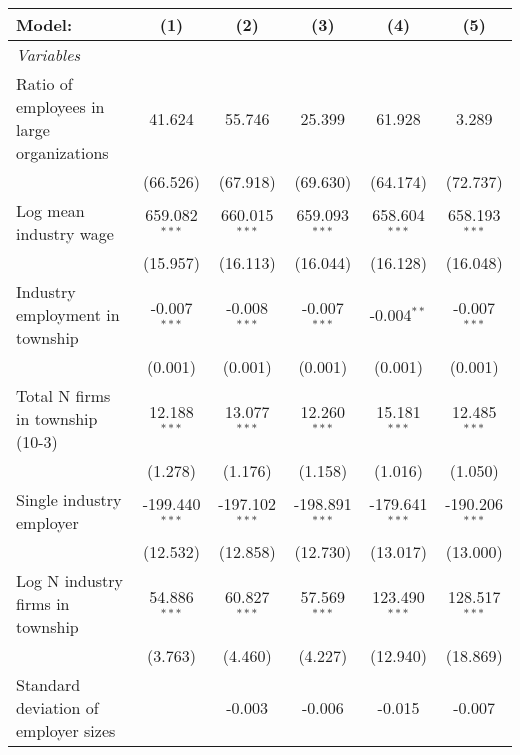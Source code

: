 \begingroup
\centering
\begin{tabular}{lccccc}
   \tabularnewline \midrule \midrule
   Model:                                    & (1)              & (2)              & (3)              & (4)              & (5)\\  
   \midrule
   \emph{Variables}\\
   Ratio of employees in large organizations & 41.624           & 55.746           & 25.399           & 61.928           & 3.289\\   
                                             & (66.526)         & (67.918)         & (69.630)         & (64.174)         & (72.737)\\   
   Log mean industry wage                    & 659.082$^{***}$  & 660.015$^{***}$  & 659.093$^{***}$  & 658.604$^{***}$  & 658.193$^{***}$\\   
                                             & (15.957)         & (16.113)         & (16.044)         & (16.128)         & (16.048)\\   
   Industry employment in township           & -0.007$^{***}$   & -0.008$^{***}$   & -0.007$^{***}$   & -0.004$^{**}$    & -0.007$^{***}$\\   
                                             & (0.001)          & (0.001)          & (0.001)          & (0.001)          & (0.001)\\   
   Total N firms in township (10-3)          & 12.188$^{***}$   & 13.077$^{***}$   & 12.260$^{***}$   & 15.181$^{***}$   & 12.485$^{***}$\\   
                                             & (1.278)          & (1.176)          & (1.158)          & (1.016)          & (1.050)\\   
   Single industry employer                  & -199.440$^{***}$ & -197.102$^{***}$ & -198.891$^{***}$ & -179.641$^{***}$ & -190.206$^{***}$\\   
                                             & (12.532)         & (12.858)         & (12.730)         & (13.017)         & (13.000)\\   
   Log N industry firms in township          & 54.886$^{***}$   & 60.827$^{***}$   & 57.569$^{***}$   & 123.490$^{***}$  & 128.517$^{***}$\\   
                                             & (3.763)          & (4.460)          & (4.227)          & (12.940)         & (18.869)\\   
   Standard deviation of employer sizes      &                  & -0.003           & -0.006           & -0.015           & -0.007\\   

\end{tabular}
